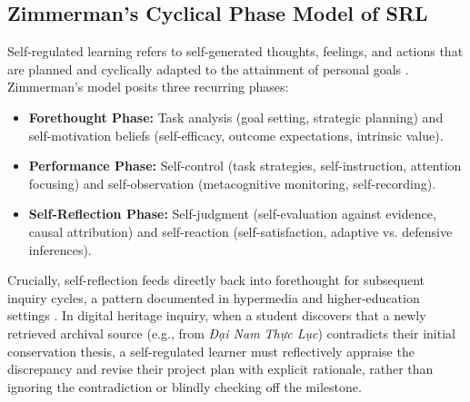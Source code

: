 \documentclass[11pt,a4paper]{article}
\begin{document}
\subsection{Zimmerman's Cyclical Phase Model of SRL}
Self-regulated learning refers to self-generated thoughts, feelings, and actions that are planned and cyclically adapted to the attainment of personal goals \cite{zimmerman2000attaining, winne1998studying}. Zimmerman's model posits three recurring phases:
\begin{itemize}
    \item \textbf{Forethought Phase:} Task analysis (goal setting, strategic planning) and self-motivation beliefs (self-efficacy, outcome expectations, intrinsic value).
    \item \textbf{Performance Phase:} Self-control (task strategies, self-instruction, attention focusing) and self-observation (metacognitive monitoring, self-recording).
    \item \textbf{Self-Reflection Phase:} Self-judgment (self-evaluation against evidence, causal attribution) and self-reaction (self-satisfaction, adaptive vs. defensive inferences).
\end{itemize}

Crucially, self-reflection feeds directly back into forethought for subsequent inquiry cycles, a pattern documented in hypermedia and higher-education settings \cite{moos2008self, schunk2018handbook}. In digital heritage inquiry, when a student discovers that a newly retrieved archival source (e.g., from \textit{Đại Nam Thực Lục}) contradicts their initial conservation thesis, a self-regulated learner must reflectively appraise the discrepancy and revise their project plan with explicit rationale, rather than ignoring the contradiction or blindly checking off the milestone.
\end{document}
